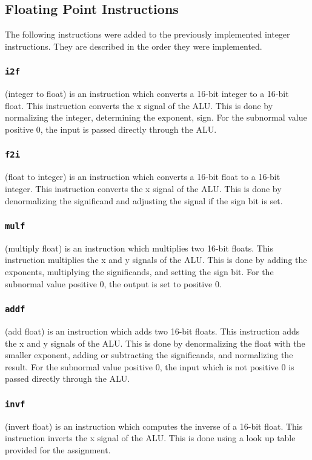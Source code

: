 \documentclass[conference]{IEEEtran}
\begin{document}
\subsection{Floating Point Instructions}
The following instructions were added to the previously implemented integer
instructions. They are described in the order they were implemented.
\subsubsection{\texttt{i2f}}
(integer to float) is an instruction which converts a 16-bit
integer to a 16-bit float. This instruction converts the x signal of the ALU.
This is done by normalizing the integer, determining
the exponent, sign. For the subnormal value positive 0, the input is passed
directly through the ALU.
\subsubsection{\texttt{f2i}}
(float to integer) is an instruction which converts a 16-bit
float to a 16-bit integer. This instruction converts the x signal of the ALU.
This is done by denormalizing the significand and adjusting the signal if the
sign bit is set. 
\subsubsection{\texttt{mulf}}
(multiply float) is an instruction which multiplies two 16-bit
floats. This instruction multiplies the x and y signals of the ALU. This is 
done by adding the exponents, multiplying the significands, and setting the
sign bit. For the subnormal value positive 0, the output is set to positive
0.
\subsubsection{\texttt{addf}}
(add float) is an instruction which adds two 16-bit floats. This
instruction adds the x and y signals of the ALU. This is done by denormalizing
the float with the smaller exponent, adding or subtracting the significands,
and normalizing the result. For the subnormal value positive 0, the input which
is not positive 0 is passed directly through the ALU.
\subsubsection{\texttt{invf}}
(invert float) is an instruction which computes the inverse of a 16-bit
float. This instruction inverts the x signal of the ALU. This is done using
a look up table provided for the assignment.\cite{invf-lut}
\end{document}
